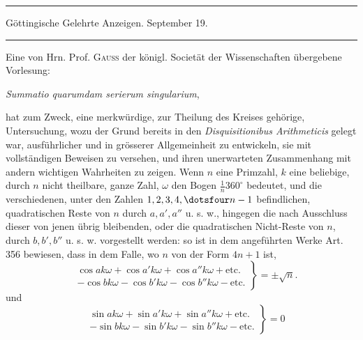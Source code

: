 \clearpage{}%
\begin{center}
\rule{.98\linewidth}{.3pt}\par
Göttingische Gelehrte Anzeigen. September 19.\par
\rule{.98\linewidth}{.3pt}
\end{center}

Eine von Hrn. Prof. \textsc{Gauss} der königl. Societät der Wissenschaften übergebene Vorlesung:
\begin{center}\emph{Summatio quarumdam serierum singularium},\end{center}
hat zum Zweck, eine merkwürdige, zur Theilung des Kreises gehörige, Untersuchung, wozu der Grund bereits in den \emph{Disquisitionibus Arithmeticis} gelegt war, ausführlicher und in grösserer Allgemeinheit zu entwickeln, sie mit vollständigen Beweisen zu versehen, und ihren unerwarteten Zusammenhang mit andern wichtigen Wahrheiten zu zeigen. Wenn $n$ eine Primzahl, $k$ eine beliebige, durch $n$ nicht theilbare, ganze Zahl, $\omega$ den Bogen $\frac1n360^\circ$ bedeutet, und die verschiedenen, unter den Zahlen $1,2,3,4,\dotsfour n-1$ befindlichen, quadratischen Reste von $n$ durch $a,a',a''$ u. s. w., hingegen die nach Ausschluss dieser von jenen übrig bleibenden, oder die quadratischen Nicht-Reste von $n$, durch $b,b',b''$ u. s. w. vorgestellt werden: so ist in dem angeführten Werke Art. 356 bewiesen, dass in dem Falle, wo $n$ von der Form $4n+1$ ist,
\[
\left.\begin{aligned}
&\cos ak\omega+\cos a'k\omega+\cos a''k\omega+\text{etc.}\\
&-\cos bk\omega-\cos b'k\omega-\cos b''k\omega-\text{etc.}
\end{aligned}\right\}=\pm\surd n.
\]
und
\[
\left.\begin{aligned}
&\sin ak\omega+\sin a'k\omega+\sin a''k\omega+\text{etc.}\\
&-\sin bk\omega-\sin b'k\omega-\sin b''k\omega-\text{etc.}
\end{aligned}\right\}=0
\]
%
